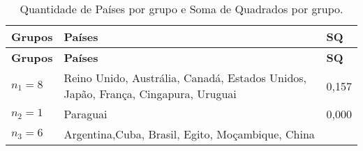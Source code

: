 \documentclass[
]{book}
\begin{document}
\begin{longtable}[]{@{}lll@{}}
\caption{\label{tab:excmeans2} Quantidade de Países por grupo e Soma de Quadrados por grupo.}\tabularnewline
\toprule
\begin{minipage}[b]{0.30\columnwidth}\raggedright
\textbf{Grupos}\strut
\end{minipage} & \begin{minipage}[b]{0.30\columnwidth}\raggedright
\textbf{Países}\strut
\end{minipage} & \begin{minipage}[b]{0.30\columnwidth}\raggedright
\textbf{SQ}\strut
\end{minipage}\tabularnewline
\midrule
\endfirsthead
\toprule
\begin{minipage}[b]{0.30\columnwidth}\raggedright
\textbf{Grupos}\strut
\end{minipage} & \begin{minipage}[b]{0.30\columnwidth}\raggedright
\textbf{Países}\strut
\end{minipage} & \begin{minipage}[b]{0.30\columnwidth}\raggedright
\textbf{SQ}\strut
\end{minipage}\tabularnewline
\midrule
\endhead
\begin{minipage}[t]{0.30\columnwidth}\raggedright
\(n_1=8\)\strut
\end{minipage} & \begin{minipage}[t]{0.30\columnwidth}\raggedright
Reino Unido, Austrália, Canadá, Estados Unidos, Japão, França, Cingapura, Uruguai\strut
\end{minipage} & \begin{minipage}[t]{0.30\columnwidth}\raggedright
0,157\strut
\end{minipage}\tabularnewline
\begin{minipage}[t]{0.30\columnwidth}\raggedright
\(n_2=1\)\strut
\end{minipage} & \begin{minipage}[t]{0.30\columnwidth}\raggedright
Paraguai\strut
\end{minipage} & \begin{minipage}[t]{0.30\columnwidth}\raggedright
0,000\strut
\end{minipage}\tabularnewline
\begin{minipage}[t]{0.30\columnwidth}\raggedright
\(n_3=6\)\strut
\end{minipage} & \begin{minipage}[t]{0.30\columnwidth}\raggedright
Argentina,Cuba, Brasil, Egito, Moçambique, China\strut

\end{minipage}
\end{longtable}
\end{document}
